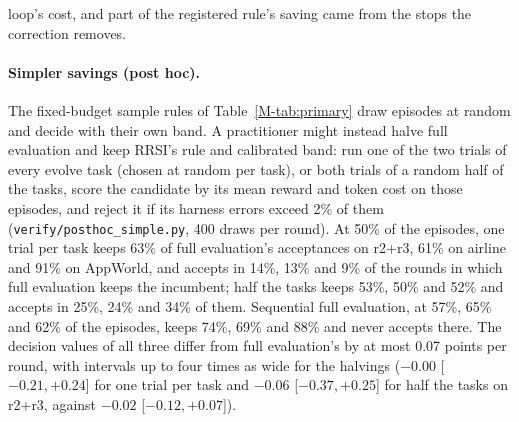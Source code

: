 \documentclass[11pt]{article}
\begin{document}
loop's cost, and part of the registered rule's saving came from the stops the correction removes.

\paragraph{Simpler savings (post hoc).} The fixed-budget sample rules of Table~\ref*{M-tab:primary} draw episodes at random and decide with their own band. A practitioner might instead halve full evaluation and keep RRSI's rule and calibrated band: run one of the two trials of every evolve task (chosen at random per task), or both trials of a random half of the tasks, score the candidate by its mean reward and token cost on those episodes, and reject it if its harness errors exceed 2\% of them (\texttt{verify/posthoc\_simple.py}, 400 draws per round). At 50\% of the episodes, one trial per task keeps 63\% of full evaluation's acceptances on r2+r3, 61\% on airline and 91\% on AppWorld, and accepts in 14\%, 13\% and 9\% of the rounds in which full evaluation keeps the incumbent; half the tasks keeps 53\%, 50\% and 52\% and accepts in 25\%, 24\% and 34\% of them. Sequential full evaluation, at 57\%, 65\% and 62\% of the episodes, keeps 74\%, 69\% and 88\% and never accepts there. The decision values of all three differ from full evaluation's by at most 0.07 points per round, with intervals up to four times as wide for the halvings ($-0.00$ [$-0.21,+0.24$] for one trial per task and $-0.06$ [$-0.37,+0.25$] for half the tasks on r2+r3, against $-0.02$ [$-0.12,+0.07$]).
\end{document}
